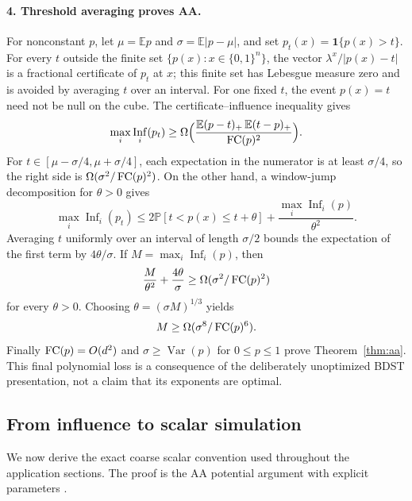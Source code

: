 \documentclass[11pt]{article}
\theoremstyle{definition}\newtheorem{definition}[theorem]{Definition}
\theoremstyle{remark}\newtheorem{remark}[theorem]{Remark}
\newcommand{\E}{\mathbb E}\newcommand{\Prb}{\mathbb P}
\DeclareMathOperator{\Inf}{Inf}\DeclareMathOperator{\Var}{Var}
\begin{document}
\paragraph{4. Threshold averaging proves AA.}
For nonconstant \(p\), let \(\mu=\E p\) and \(\sigma=\E|p-\mu|\), and set \(p_t(x)=\mathbf 1\{p(x)>t\}\). For every \(t\) outside the finite set \(\{p(x):x\in\{0,1\}^n\}\), the vector \(\lambda^x/|p(x)-t|\) is a fractional certificate of \(p_t\) at \(x\); this finite set has Lebesgue measure zero and is avoided by averaging \(t\) over an interval. For one fixed \(t\), the event \(p(x)=t\) need not be null on the cube. The certificate--influence inequality gives
\[
 \max_i\Inf_i(p_t)\ge\Omega\Bigl(\frac{\E(p-t)_+\,\E(t-p)_+}{\FC(p)^2}\Bigr).
\]
For \(t\in[\mu-\sigma/4,\mu+\sigma/4]\), each expectation in the numerator is at least \(\sigma/4\), so the right side is \(\Omega(\sigma^2/\operatorname{FC}(p)^2)\). On the other hand, a window-jump decomposition for \(\theta>0\) gives
\[
 \max_i\Inf_i(p_t)\le2\Prb[t<p(x)\le t+\theta]+\frac{\max_i\Inf_i(p)}{\theta^2}.
\]
Averaging \(t\) uniformly over an interval of length \(\sigma/2\) bounds the expectation of the first term by \(4\theta/\sigma\). If \(M=\max_i\Inf_i(p)\), then
\[
 \frac{M}{\theta^2}+\frac{4\theta}{\sigma}\ge\Omega(\sigma^2/\operatorname{FC}(p)^2)
\]
for every \(\theta>0\). Choosing \(\theta=(\sigma M)^{1/3}\) yields
\[
 M\ge\Omega(\sigma^8/\operatorname{FC}(p)^6).
\]
Finally \(\operatorname{FC}(p)=O(d^2)\) and \(\sigma\ge\Var(p)\) for \(0\le p\le1\) prove Theorem~\ref{thm:aa}. This final polynomial loss is a consequence of the deliberately unoptimized BDST presentation, not a claim that its exponents are optimal.

\subsection{From influence to scalar simulation}
We now derive the exact coarse scalar convention used throughout the application sections. The proof is the AA potential argument with explicit parameters \cite{AA14,BDST26}.
\end{document}

